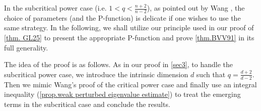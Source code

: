 \documentclass[12pt]{amsart}
\numberwithin{equation}{section}
\numberwithin{lemma}{section}
\numberwithin{proposition}{section}
\numberwithin{corollary}{section}
\numberwithin{remark}{section}
\begin{document}
In the subcritical power case (i.e. $1<q<\frac{n+2}{n-2}$), as pointed out by Wang \cite[Section 5]{Wan22}, the choice of parameters (and the P-function) is delicate if one wishes to use the same strategy. In the following, we shall utilize our principle used in our proof of \cref{thm. GL25} to present the appropriate P-function and prove \cref{thm.BVV91} in its full generality.

The idea of the proof is as follows. As in our proof in \cref{sec3}, to handle the subcritical power case, we introduce the intrinsic dimension $d$ such that $q=\frac{d+2}{d-2}$. Then we mimic Wang's proof of the critical power case \cite{Wan22} and finally use an integral inequality (\cref{prop.weak perturbed eigenvalue estimate}) to treat the emerging terms in the subcritical case and conclude the results.
\end{document}
